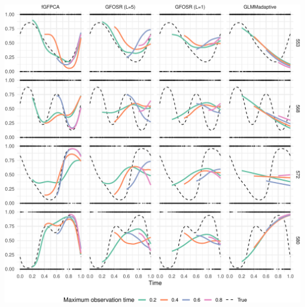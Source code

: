 \documentclass[
]{article}
\begin{document}
\includegraphics{manuscript_files/figure-latex/fig_large_sim_paper-1.pdf}
\end{document}
